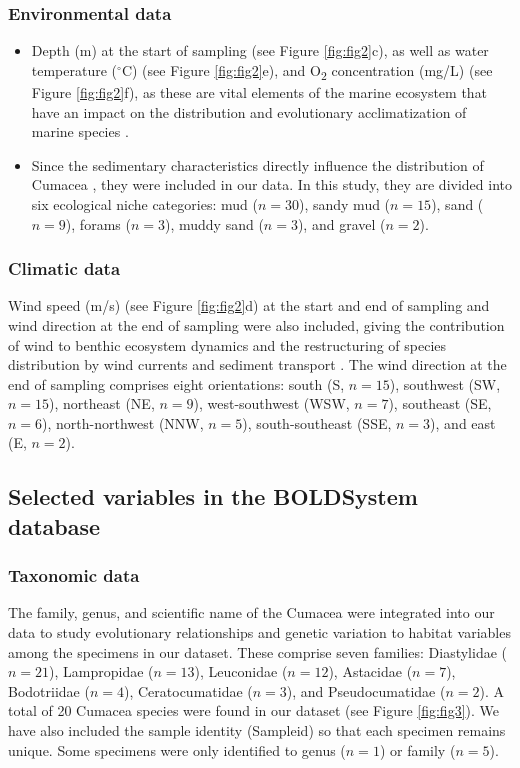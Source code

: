 {\subsubsection{Environmental data}
\begin{itemize}
\item Depth (m) at the start of sampling (see Figure \ref{fig:fig2}c), as well as water temperature ($^\circ$C) (see Figure \ref{fig:fig2}e), and O\textsubscript{2} concentration (mg/L) (see Figure \ref{fig:fig2}f), as these are vital elements of the marine ecosystem that have an impact on the distribution and evolutionary acclimatization of marine species \citep{rex2006global, danovaro2010first}.
\item Since the sedimentary characteristics directly influence the distribution of Cumacea \citep{uhlir_adding_2021}, they were included in our data. In this study, they are divided into six ecological niche categories: mud ($n=30$), sandy mud ($n=15$), sand ($n=9$), forams ($n=3$), muddy sand ($n=3$), and gravel ($n=2$).
\end{itemize}

\subsubsection{Climatic data}
Wind speed (m/s) (see Figure \ref{fig:fig2}d) at the start and end of sampling and wind direction at the end of sampling were also included, giving the contribution of wind to benthic ecosystem dynamics and the restructuring of species distribution by wind currents and sediment transport \citep{siedlecki2016experiments, waga_recent_2020,saeedi_environmental_2022}. The wind direction at the end of sampling comprises eight orientations: south (S, $n=15$), southwest (SW, $n=15$), northeast (NE, $n=9$), west-southwest (WSW, $n=7$), southeast (SE, $n=6$), north-northwest (NNW, $n=5$), south-southeast (SSE, $n=3$), and east (E, $n=2$).

\subsection{Selected variables in the BOLDSystem database}
\subsubsection{Taxonomic data}
The family, genus, and scientific name of the Cumacea were integrated into our data to study evolutionary relationships and genetic variation to habitat variables among the specimens in our dataset. These comprise seven families: Diastylidae ($n=21$), Lampropidae ($n=13$), Leuconidae ($n=12$), Astacidae ($n=7$), Bodotriidae ($n=4$), Ceratocumatidae ($n=3$), and Pseudocumatidae ($n=2$). A total of 20 Cumacea species were found in our dataset (see Figure \ref{fig:fig3}). We have also included the sample identity (Sampleid) so that each specimen remains unique. Some specimens were only identified to genus ($n=1$) or family ($n=5$).

}
